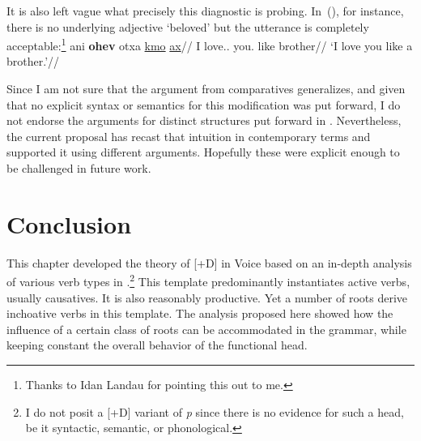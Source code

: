 It is also left vague what precisely this diagnostic is probing. In~(\nextx), for instance, there is no underlying adjective `beloved' but the utterance is completely acceptable:\footnote{Thanks to Idan Landau for pointing this out to me.}
\ex
	\begingl
	\gla ani \textbf{ohev} otxa \underline{kmo} \underline{ax}//
	\glb I love.. you. like brother//
	\glft `I love you like a brother.'//
	\endgl
\xe


Since I am not sure that the argument from comparatives generalizes, and given that no explicit syntax or semantics for this modification was put forward, I do not endorse the arguments for distinct structures put forward in \cite{borer91}. Nevertheless, the current proposal has recast that intuition in contemporary terms and supported it using different arguments. Hopefully these were explicit enough to be challenged in future work.


\section{Conclusion} \label{vd:sum}
This chapter developed the theory of [+D] in Voice based on an in-depth analysis of various verb types in {\thif}.\footnote{I do not posit a [+D] variant of \textit{p} since there is no evidence for such a head, be it syntactic, semantic, or phonological.} This template predominantly instantiates active verbs, usually causatives. It is also reasonably productive. Yet a number of roots derive inchoative verbs in this template. The analysis proposed here showed how the influence of a certain class of roots can be accommodated in the grammar, while keeping constant the overall behavior of the functional head.

